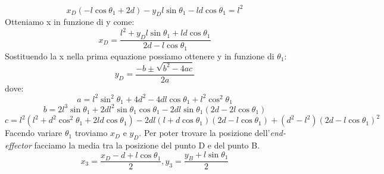 \begin{equation*}
	x_D(-l\cos\theta_1+2d) -y_Dl\sin\theta_1 - ld\cos\theta_1 = l^2
\end{equation*}
Otteniamo x in funzione di y come:
\begin{equation*}
	x_{D} = \frac{l^2+y_{D}l\sin\theta_1+ld\cos\theta_1}{2d-l\cos\theta_1}
\end{equation*}
 Sostituendo la x nella prima equazione possiamo ottenere y in funzione di $\theta_1$:
 \begin{equation}
 	y_{D} = \frac{-b\pm \sqrt{b^2-4ac}}{2a}
 \end{equation}
 dove:
\begin{equation*}
	a = l^2\sin^2\theta_1 + 4d^2-4dl\cos\theta_1 + l^2\cos^2\theta_1
\end{equation*}
\begin{equation*}
	b = 2l^3\sin\theta_1 + 2dl^2\sin\theta_1\cos\theta_1-2dl\sin\theta_1(2d-2l\cos\theta_1)
\end{equation*}
\begin{equation*}
	c = l^2(l^2+d^2\cos^2\theta_1+2ld\cos\theta_1)-2dl(l+d\cos\theta_1)(2d-l\cos\theta_1)+(d^2-l^2)(2d-l\cos\theta_1)^2
\end{equation*}
Facendo variare $\theta_1$ troviamo $x_D$ e $y_D$. Per poter trovare la posizione dell'\textit{end-effector} facciamo la media tra la posizione del punto D e del punto B.
\begin{equation}
	x_3 = \frac{x_D-d+l\cos\theta_1}{2}, y_3 = \frac{y_B+l\sin\theta_1}{2}
\end{equation}

